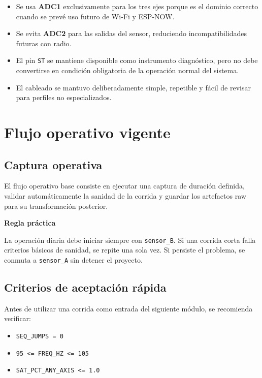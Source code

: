\documentclass[11pt,a4paper]{article}
\begin{document}
\begin{itemize}
  \item Se usa \textbf{ADC1} exclusivamente para los tres ejes porque es el dominio correcto cuando se prevé uso futuro de Wi-Fi y ESP-NOW.
  \item Se evita \textbf{ADC2} para las salidas del sensor, reduciendo incompatibilidades futuras con radio.
  \item El pin \texttt{ST} se mantiene disponible como instrumento diagnóstico, pero no debe convertirse en condición obligatoria de la operación normal del sistema.
  \item El cableado se mantuvo deliberadamente simple, repetible y fácil de revisar para perfiles no especializados.
\end{itemize}

\section{Flujo operativo vigente}

\subsection{Captura operativa}

El flujo operativo base consiste en ejecutar una captura de duración definida, validar automáticamente la sanidad de la corrida y guardar los artefactos raw para su transformación posterior.

\begin{infobox}
\textbf{Regla práctica}\par
La operación diaria debe iniciar siempre con \texttt{sensor\_B}. Si una corrida corta falla criterios básicos de sanidad, se repite una sola vez. Si persiste el problema, se conmuta a \texttt{sensor\_A} sin detener el proyecto.
\end{infobox}

\subsection{Criterios de aceptación rápida}

Antes de utilizar una corrida como entrada del siguiente módulo, se recomienda verificar:

\begin{itemize}
  \item \texttt{SEQ\_JUMPS = 0}
  \item \texttt{95 \textless= FREQ\_HZ \textless= 105}
  \item \texttt{SAT\_PCT\_ANY\_AXIS \textless= 1.0}
\end{itemize}
\end{document}
